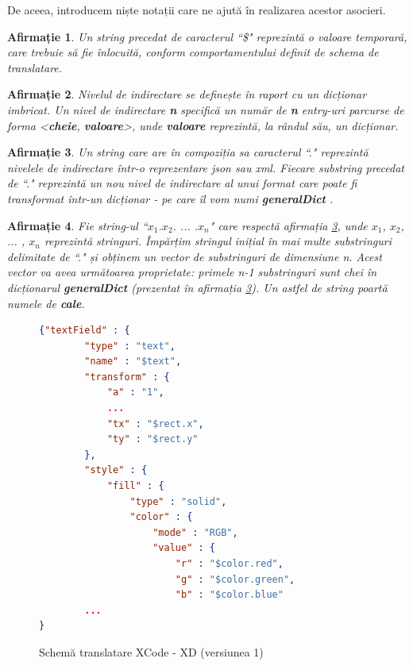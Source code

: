 De aceea, introducem niște notații care ne ajută în realizarea acestor asocieri. 
\\

\newtheorem{mydef}{Afirmație}[chapter]
\newtheorem{myNote}{Notă}[chapter]

\begin{mydef}\label{dollar}
Un string precedat de caracterul ``\$" reprezintă o valoare temporară, care trebuie să fie înlocuită, conform comportamentului definit de schema de translatare.\\
\end{mydef}


\begin{mydef}\label{nivel}
Nivelul de indirectare se definește în raport cu un dicționar imbricat. Un nivel de indirectare \textbf{n} specifică un număr de \textbf{n} entry-uri parcurse de forma <\textbf{cheie}, \textbf{valoare}>, unde \textbf{valoare} reprezintă, la rândul său, un dicționar.\\
\end{mydef}


\begin{mydef}\label{dot}
Un string care are în compoziția sa caracterul ``." reprezintă nivelele de indirectare într-o reprezentare json sau xml. Fiecare substring precedat de ``." reprezintă un nou nivel de indirectare al unui format care poate fi transformat într-un dicționar - pe care îl vom numi \textbf{generalDict} .\\
\end{mydef}


\begin{mydef}\label{count}
Fie string-ul ``$x_1$.$x_2$. ... .$x_n$" care respectă afirmația \ref{dot}, unde $x_1$, $x_2$, ... , $x_n$ reprezintă stringuri. Împărțim stringul inițial în mai multe substringuri delimitate de ``." și obținem un vector de substringuri de dimensiune n. Acest vector va avea următoarea proprietate: primele n-1 substringuri sunt chei în dicționarul \textbf{generalDict} (prezentat în afirmația \ref{dot}). Un astfel de string poartă numele de \textbf{\textit{cale}}. \\
\end{mydef}


\begin{figure}[!htbp]
\begin{lstlisting}[language=json,firstnumber=1]
{"textField" : {
        "type" : "text",
        "name" : "$text",
        "transform" : {
            "a" : "1",
            ...
            "tx" : "$rect.x",
            "ty" : "$rect.y"
        },
        "style" : {
            "fill" : {
                "type" : "solid",
                "color" : {
                    "mode" : "RGB",
                    "value" : {
                        "r" : "$color.red",
                        "g" : "$color.green",
                        "b" : "$color.blue"
        ...
}

\end{lstlisting}
\caption{Schemă translatare XCode - XD (versiunea 1)} \label{fig:XCode2XD Schema}
\end{figure}

